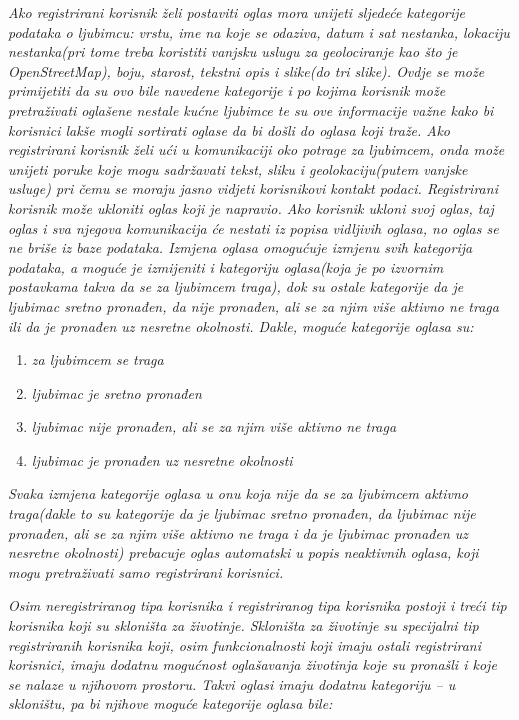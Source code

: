 		\textit{Ako registrirani korisnik želi postaviti oglas mora unijeti sljedeće kategorije podataka o ljubimcu: vrstu, ime na koje se odaziva, datum i sat nestanka, lokaciju nestanka(pri tome treba koristiti vanjsku uslugu za geolociranje kao što je OpenStreetMap), boju, starost, tekstni opis i slike(do tri slike). Ovdje se može primijetiti da su ovo bile navedene kategorije i po kojima korisnik može pretraživati oglašene nestale kućne ljubimce te su ove informacije važne kako bi korisnici lakše mogli sortirati oglase da bi došli do oglasa koji traže.  Ako registrirani korisnik želi ući u komunikaciji oko potrage za ljubimcem, onda može unijeti poruke koje mogu sadržavati tekst, sliku i geolokaciju(putem vanjske usluge) pri čemu se moraju jasno vidjeti korisnikovi kontakt podaci. Registrirani korisnik može ukloniti oglas koji je napravio. Ako korisnik ukloni svoj oglas, taj oglas i sva njegova komunikacija će nestati iz popisa vidljivih oglasa, no oglas se ne briše iz baze podataka. Izmjena oglasa omogućuje izmjenu svih kategorija podataka, a moguće je izmijeniti i kategoriju oglasa(koja je po izvornim postavkama takva da se za ljubimcem traga), dok su ostale kategorije da je ljubimac sretno pronađen, da nije pronađen, ali se za njim više aktivno ne traga ili da je pronađen uz nesretne okolnosti. Dakle, moguće kategorije oglasa su:}
		
		\begin{enumerate}
			\item \textit{za ljubimcem se traga}
			\item \textit{ljubimac je sretno pronađen}
			\item \textit{ljubimac nije pronađen, ali se za njim više aktivno ne traga}
			\item \textit{ljubimac je pronađen uz nesretne okolnosti}
		\end{enumerate}
		
		\textit{Svaka izmjena kategorije oglasa u onu koja nije da se za ljubimcem aktivno traga(dakle to su kategorije da je ljubimac sretno pronađen, da ljubimac nije pronađen, ali se za njim više aktivno ne traga i da je ljubimac pronađen uz nesretne okolnosti) prebacuje oglas automatski u popis neaktivnih oglasa, koji mogu pretraživati samo registrirani korisnici.}
		
		\textit{Osim neregistriranog tipa korisnika i registriranog tipa korisnika postoji i treći tip korisnika koji su skloništa za životinje. Skloništa za životinje su specijalni tip registriranih korisnika koji, osim funkcionalnosti koji imaju ostali registrirani korisnici, imaju dodatnu mogućnost oglašavanja životinja koje su pronašli i koje se nalaze u njihovom prostoru. Takvi oglasi imaju dodatnu kategoriju – u skloništu, pa bi njihove moguće kategorije oglasa bile:}
		
